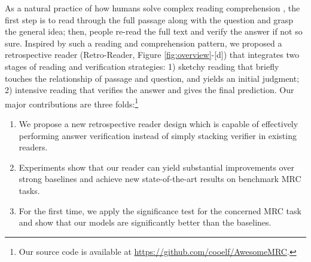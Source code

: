 \documentclass[letterpaper]{article} %
\begin{document}
As a natural practice of how humans solve complex reading comprehension \cite{DBLP:conf/sigir/ZhengMLYZM19,doi:10.1080/00461520.1987.9653053}, the first step is to read through the full passage along with the question and grasp the general idea; then, people re-read the full text and verify the answer if not so sure. Inspired by such a reading and comprehension pattern, we proposed a retrospective reader (Retro-Reader, Figure \ref{fig:overview}-[d]) that integrates two stages of reading and verification strategies: 1) sketchy reading that briefly touches the relationship of passage and question, and yields an initial judgment; 2) intensive reading that verifies the answer and gives the final prediction. Our major contributions are three folds:\footnote{Our source code is available at \url{https://github.com/cooelf/AwesomeMRC}.}

\begin{enumerate}
	\item We propose a new retrospective reader design which is capable of effectively performing answer verification instead of simply stacking verifier in existing readers.
	\item Experiments show that our reader can yield substantial improvements over strong baselines and achieve new state-of-the-art results on benchmark MRC tasks.
	\item For the first time, we apply the significance test for the concerned MRC task and show that our models are significantly better than the baselines.
\end{enumerate}
\end{document}

